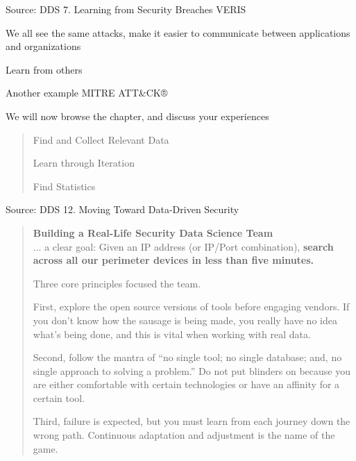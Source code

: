 \documentclass[Screen16to9,17pt]{foils}
\begin{document}


\begin{quote}

\end{quote}

Source: DDS 7. Learning from Security Breaches VERIS
\begin{list2}
\item We all see the same attacks, make it easier to communicate between applications and organizations
\item Learn from others
\item Another example MITRE ATT\&CK® 
\end{list2}

We will now browse the chapter, and discuss your experiences



\begin{quote}
\begin{list2}
\item Find and Collect Relevant Data
\item Learn through Iteration
\item Find Statistics
\end{list2}

\end{quote}
Source: DDS 12. Moving Toward Data-Driven Security




\begin{quote}{\bf
Building a Real-Life Security Data Science Team}\\

... a clear goal: Given an IP address (or IP/Port combination), {\bf search across all our perimeter devices in less than five minutes.}

Three core principles focused the team.
\begin{list2}
\item First, explore the open source versions of tools before engaging vendors. If you don’t
know how the sausage is being made, you really have no idea what’s being done, and
this is vital when working with real data.
\item Second, follow the mantra of “no single tool; no single database; and, no single approach
to solving a problem.” Do not put blinders on because you are either comfortable with
certain technologies or have an affinity for a certain tool.
\item Third, failure is expected, but you must learn from each journey down the wrong path.
Continuous adaptation and adjustment is the name of the game.
\end{list2}
\end{quote}
\end{document}
